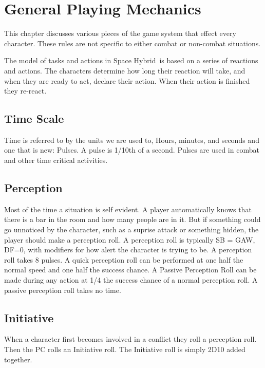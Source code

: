 \chapter{General Playing Mechanics}

This chapter discusses various pieces of the game system that 
effect every character. These rules are not specific to either 
combat or non-combat situations. 

The model of tasks and actions in Space Hybrid\ is based on a series of reactions and 
actions. The characters determine how long their reaction will take, and  
when they are ready to act, declare their action. When their action is finished 
they re-react. 

\section{Time Scale}

Time is referred to by the units we are used to, Hours, minutes, and seconds 
and one that is new: Pulses. A {pulse} is 1/10th of a second. Pulses are
used in combat and other time critical activities.

\section{Perception}

Most of the time a situation is self evident. A player automatically
knows that there is a bar in the room and how many people are in it.
But if something could go unnoticed by the character, such as a suprise 
attack or something hidden, the player should make a {perception roll}. 
A perception roll is typically SB = GAW, DF=0, with modifiers for 
how alert the character is trying to be. A perception roll takes
8 pulses. A quick perception roll can be performed at one half the normal speed
and one half the success chance. A {Passive Perception Roll} can be made 
during any action at 1/4 the success chance of a normal perception roll. A
passive perception roll takes no time.



\section{Initiative}

When a character first becomes involved in a conflict they
roll a perception roll. Then the PC rolls an {Initiative} roll. The 
Initiative roll is simply 2D10 added together.

